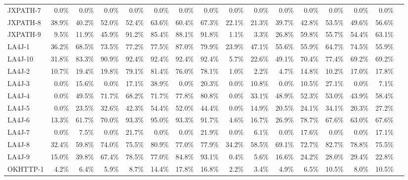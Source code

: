 \begin{tabular}{ l rrrrrrr rrrrrrrr}
JXPATH-7 &  0.0\% &  0.0\% &  0.0\% &  0.0\% &  0.0\% &  0.0\% &  0.0\% &  0.0\% &  0.0\% &  0.0\% &  0.0\% &  0.0\% &  0.0\% &  0.0\%\\ 
JXPATH-8 &  38.9\% &  40.2\% &  52.0\% &  52.4\% &  63.6\% &  60.4\% &  67.3\% &  22.1\% &  21.3\% &  39.7\% &  42.8\% &  53.5\% &  49.6\% &  56.6\%\\ 
JXPATH-9 &  9.5\% &  11.9\% &  45.9\% &  91.2\% &  85.4\% &  88.1\% &  91.8\% &  1.1\% &  3.3\% &  26.8\% &  59.8\% &  55.7\% &  54.4\% &  63.1\%\\ 
LA4J-1 &  36.2\% &  68.5\% &  73.5\% &  77.2\% &  77.5\% &  87.0\% &  79.9\% &  23.9\% &  47.1\% &  55.6\% &  55.9\% &  64.7\% &  74.5\% &  55.9\%\\ 
LA4J-10 &  31.8\% &  83.3\% &  90.9\% &  92.4\% &  92.4\% &  92.4\% &  92.4\% &  5.7\% &  22.6\% &  49.1\% &  70.4\% &  77.4\% &  69.2\% &  69.2\%\\ 
LA4J-2 &  10.7\% &  19.4\% &  19.8\% &  79.1\% &  81.4\% &  76.0\% &  78.1\% &  1.0\% &  2.2\% &  4.7\% &  14.8\% &  10.2\% &  17.0\% &  17.8\%\\ 
LA4J-3 &  0.0\% &  15.6\% &  0.0\% &  17.1\% &  38.9\% &  0.0\% &  20.3\% &  0.0\% &  10.8\% &  0.0\% &  10.5\% &  27.1\% &  0.0\% &  7.1\%\\ 
LA4J-4 &  0.0\% &  49.5\% &  71.7\% &  68.2\% &  71.7\% &  77.8\% &  80.8\% &  0.0\% &  33.1\% &  48.9\% &  52.3\% &  53.0\% &  43.9\% &  58.4\%\\ 
LA4J-5 &  0.0\% &  23.5\% &  32.6\% &  42.3\% &  54.4\% &  52.0\% &  44.4\% &  0.0\% &  14.9\% &  20.5\% &  24.1\% &  34.1\% &  20.3\% &  27.2\%\\ 
LA4J-6 &  13.3\% &  61.7\% &  70.0\% &  93.3\% &  95.0\% &  93.3\% &  91.7\% &  4.6\% &  16.7\% &  26.9\% &  78.7\% &  67.6\% &  63.0\% &  67.6\%\\ 
LA4J-7 &  0.0\% &  7.5\% &  0.0\% &  21.7\% &  0.0\% &  0.0\% &  21.9\% &  0.0\% &  6.1\% &  0.0\% &  17.6\% &  0.0\% &  0.0\% &  17.1\%\\ 
LA4J-8 &  32.4\% &  59.8\% &  74.0\% &  75.5\% &  80.9\% &  77.0\% &  77.9\% &  34.2\% &  58.5\% &  69.1\% &  72.7\% &  82.7\% &  78.8\% &  75.5\%\\ 
LA4J-9 &  15.0\% &  39.8\% &  67.4\% &  78.5\% &  77.0\% &  84.8\% &  93.1\% &  0.4\% &  5.6\% &  16.6\% &  24.2\% &  28.0\% &  29.4\% &  22.8\%\\ 
OKHTTP-1 &  4.2\% &  6.4\% &  5.9\% &  8.7\% &  14.4\% &  17.8\% &  16.8\% &  2.2\% &  3.4\% &  4.9\% &  6.5\% &  10.5\% &  8.0\% &  10.5\%\\ 

\end{tabular}
